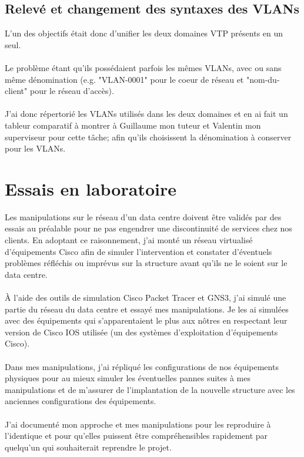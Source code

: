 \subsection{Relevé et changement des syntaxes des VLANs}

L'un des objectifs était donc d'unifier les deux domaines VTP présents en un seul.
\\ \\
Le problème étant qu'ils possédaient parfois les mêmes VLANs, avec ou sans même dénomination (e.g. "VLAN-0001" pour le coeur de réseau et "nom-du-client" pour le réseau d'accès).
\\ \\
J'ai donc répertorié les VLANs utilisés dans les deux domaines et en ai fait un tableur comparatif à montrer à Guillaume mon tuteur et Valentin mon superviseur pour cette tâche; afin qu'ils choisissent la dénomination à conserver pour les VLANs.  

\section{Essais en laboratoire}

Les manipulations sur le réseau d'un data centre doivent être validés par des essais au préalable pour ne pas engendrer une discontinuité de services chez nos clients. En adoptant ce raisonnement, j'ai monté un réseau virtualisé d'équipements Cisco afin de simuler l'intervention et constater d'éventuels problèmes réfléchis ou imprévus sur la structure avant qu'ils ne le soient sur le data centre.
\\ \\
À l'aide des outils de simulation Cisco Packet Tracer et GNS3, j'ai simulé une partie du réseau du data centre et essayé mes manipulations. Je les ai simulées avec des équipements qui s'apparentaient le plus aux nôtres en respectant leur version de Cisco IOS utilisée (un des systèmes d'exploitation d'équipements Cisco).
\\ \\
Dans mes manipulations, j'ai répliqué les configurations de nos équipements physiques pour au mieux simuler les éventuelles pannes suites à mes manipulations et de m'assurer de l'implantation de la nouvelle structure avec les anciennes configurations des équipements.
\\ \\
J'ai documenté mon approche et mes manipulations pour les reproduire à l'identique et pour qu'elles puissent être compréhensibles rapidement par quelqu'un qui souhaiterait reprendre le projet.


